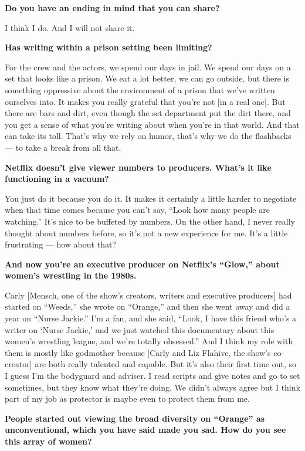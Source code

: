 \textbf{Do you have an ending in mind that you can share?}

I think I do. And I will not share it.

\textbf{Has writing within a prison setting been limiting?}

For the crew and the actors, we spend our days in jail. We spend our
days on a set that looks like a prison. We eat a lot better, we can go
outside, but there is something oppressive about the environment of a
prison that we've written ourselves into. It makes you really grateful
that you're not {[}in a real one{]}. But there are bars and dirt, even
though the set department put the dirt there, and you get a sense of
what you're writing about when you're in that world. And that can take
its toll. That's why we rely on humor, that's why we do the flashbacks
--- to take a break from all that.

\textbf{Netflix doesn't give viewer numbers to producers. What's it like
functioning in a vacuum?}

You just do it because you do it. It makes it certainly a little harder
to negotiate when that time comes because you can't say, ``Look how many
people are watching.'' It's nice to be buffeted by numbers. On the other
hand, I never really thought about numbers before, so it's not a new
experience for me. It's a little frustrating --- how about that?

\textbf{And now you're an executive producer on Netflix's ``Glow,''
about women's wrestling in the 1980s.}

Carly {[}Mensch, one of the show's creators, writers and executive
producers{]} had started on ``Weeds,'' she wrote on ``Orange,'' and then
she went away and did a year on ``Nurse Jackie.'' I'm a fan, and she
said, ``Look, I have this friend who's a writer on `Nurse Jackie,' and
we just watched this documentary about this women's wrestling league,
and we're totally obsessed.'' And I think my role with them is mostly
like godmother because {[}Carly and Liz Flahive, the show's
co-creator{]} are both really talented and capable. But it's also their
first time out, so I guess I'm the bodyguard and adviser. I read scripts
and give notes and go to set sometimes, but they know what they're
doing. We didn't always agree but I think part of my job as protector is
maybe even to protect them from me.

\textbf{People started out viewing the broad diversity on ``Orange'' as
unconventional, which you have said made you sad. How do you see this
array of women?}


